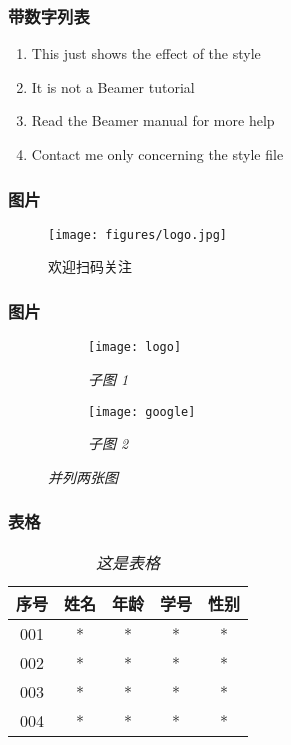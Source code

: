 \documentclass[10pt,aspectratio=43,serif]{beamer}
\begin{document}
\begin{frame}
    \frametitle{带数字列表}
    \begin{enumerate}
        \item This just shows the effect of the style
        \item It is not a Beamer tutorial
        \item Read the Beamer manual for more help
        \item Contact me only concerning the style file
    \end{enumerate}
\end{frame}

\begin{frame}
    \frametitle{图片}
    \begin{figure}
        \texttt{[image: figures/logo.jpg]}
        \caption{欢迎扫码关注}
    \end{figure}
\end{frame}

\begin{frame}
    \frametitle{图片}
    \begin{figure}[H]
        \centering
        \begin{subfigure}{.48\textwidth}
            \centering
            \texttt{[image: logo]}
            \caption{\em 子图 1}
            \label{fig:v21}
        \end{subfigure}
        \begin{subfigure}{.48\textwidth}
            \centering
            \texttt{[image: google]}
            \caption{\em 子图 2}
            \label{fig:v22}
        \end{subfigure}
        \caption{\em 并列两张图}
        \label{fig:v2}
    \end{figure}
\end{frame}

\begin{frame}
    \frametitle{表格}
    \begin{table}[ht]
        \centering
        \caption{\em 这是表格}
        \vskip 0.1in
        \label{table}
        \begin{tabular}{c|cccc}
          \hline
          \hline
          \rule{0pt}{3ex}
          序号 & 姓名 & 年龄 & 学号 & 性别 
                                      \rule[-1.2ex]{0pt}{0pt} \\\hline
          001 & *  &  *  & *  & * \\ 
          002 & *  &  *  & *  & * \\
          003 & *  &  *  & *  & * \\      
          004 & *  &  *  & *  & * \\
          \hline
          \hline 
        \end{tabular}
    \end{table}
\end{frame}
\end{document}
